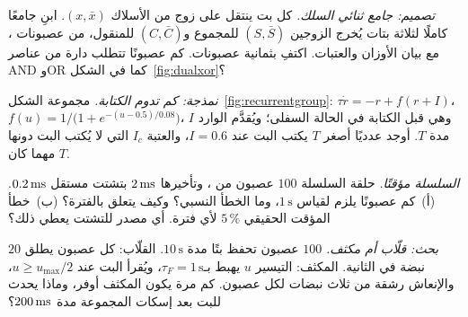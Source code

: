 \begin{exercise}[\lvlB]
\label{ex:02:4}
\emph{تصميم: جامع ثنائي السلك.} كل بت ينتقل على زوج من الأسلاك $(x,\bar x)$. ابنِ جامعًا كاملًا لثلاثة بتات يُخرج الزوجين $(S,\bar S)$ للمجموع و$(C,\bar C)$ للمنقول، من عصبونات ، مع بيان الأوزان والعتبات. اكتفِ بثمانية عصبونات. كم عصبونًا تتطلب دارة من عناصر \foreignlanguage{english}{AND} و\foreignlanguage{english}{OR} كما في الشكل~\ref{fig:dualxor}؟
\end{exercise}

\begin{exercise}[\lvlB]
\label{ex:02:5}
\emph{نمذجة: كم تدوم الكتابة.} مجموعة الشكل~\ref{fig:recurrentgroup}: $\tau\dot r=-r+f(r+I)$، $f(u)=1/\bigl(1+e^{-(u-0.5)/0.08}\bigr)$، وهي قبل الكتابة في الحالة السفلى؛ ويُقدَّم الوارد $I$ مدة $T$. أوجد عدديًا أصغر $T$ يكتب البت عند $I=0.6$، والعتبة $I_c$ التي لا يُكتب البت دونها مهما كان $T$.
\end{exercise}

\begin{exercise}[\lvlA]
\label{ex:02:6}
\emph{السلسلة مؤقتًا.} حلقة السلسلة $100$ عصبون من ، وتأخيرها $2\,\text{ms}$ بتشتت مستقل $0.2\,\text{ms}$. (أ)~كم عصبونًا يلزم لقياس $1\,\text{s}$، وما الخطأ النسبي؟ وكيف يتعلق بالفترة؟ (ب)~خطأ المؤقت الحقيقي $5\,\%$ لأي فترة. أي مصدر للتشتت يعطي ذلك؟
\end{exercise}

\begin{exercise}[\lvlC]
\label{ex:02:7}
\emph{بحث: قلّاب أم مكثف.} $100$ عصبون تحفظ بتًا مدة $10\,\text{s}$. القلّاب: كل عصبون يطلق $20$ نبضة في الثانية. المكثف: التيسير $u$ يهبط بـ$\tau_F=1\,\text{s}$، ويُقرأ البت عند $u\ge u_{\max}/2$، والإنعاش رشقة من ثلاث نبضات لكل عصبون. كم مرة يكون المكثف أوفر، وماذا يحدث للبت بعد إسكات المجموعة مدة $200\,\text{ms}$؟
\end{exercise}
